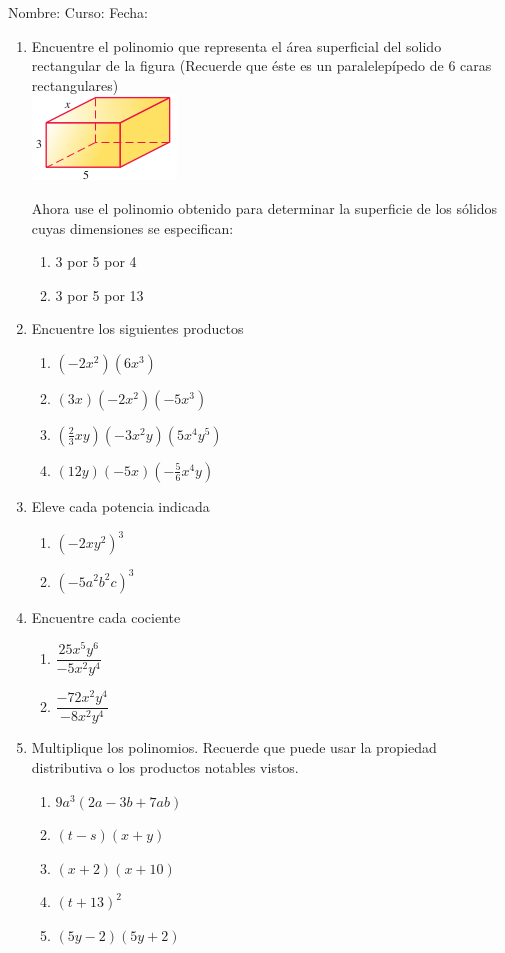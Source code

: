 \documentclass[letterpaper,fleqn]{article}
\newcommand{\LineaNombre}{%
\par
\vspace{\baselineskip}
Nombre:\hrulefill \; Curso: \underline{\hspace*{48pt}} \; Fecha: \underline{\hspace*{2.5cm}} \relax
\par}
\begin{document}
\LineaNombre
\begin{enumerate}
 \item Encuentre el polinomio que representa el área superficial del solido rectangular de la figura (Recuerde que \'{e}ste es un paralelep\'{i}pedo de 6 caras rectangulares)\\

\includegraphics[scale=1]{Images/solido01.png} 

\noanswer
Ahora use el polinomio obtenido para determinar la superficie de los sólidos cuyas dimensiones se especifican:
\begin{enumerate}
\item 3 por 5 por 4\noanswer
\item 3 por 5 por 13\noanswer
\end{enumerate}
\item Encuentre los siguientes productos
\begin{enumerate}
\item $(-2x^{2})(6x^{3})$\noanswer
\item $(3x)(-2x^{2})(-5x^{3})$\noanswer
\item $(\frac{2}{3}xy)(-3x^{2}y)(5x^{4}y^{5})$\noanswer
\item $(12y)(-5x)(-\frac{5}{6}x^{4}y)$\noanswer
\end{enumerate}
\item Eleve cada potencia indicada
\begin{enumerate}
\item $(-2xy^{2})^{3}$\noanswer
\item $(-5a^{2}b^{2}c)^{3}$\noanswer
\end{enumerate}
\item Encuentre cada cociente
\begin{enumerate}
\item $\dfrac{25x^{5}y^{6}}{-5x^{2}y^{4}}$\noanswer
\item $\dfrac{-72x^{2}y^{4}}{-8x^{2}y^{4}}$\noanswer
\end{enumerate}
\item Multiplique los polinomios. Recuerde que puede usar la propiedad distributiva o los productos notables vistos.
\begin{enumerate}
\item $9a^{3}(2a-3b+7ab)$\noanswer
\item $(t-s)(x+y)$\noanswer
\item $(x+2)(x+10)$\noanswer
\item $(t+13)^{2}$\noanswer
\item $(5y-2)(5y+2)$\noanswer
\end{enumerate}
 \end{enumerate}
\end{document}
